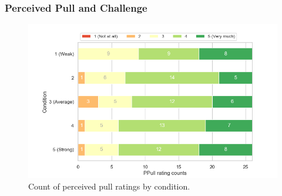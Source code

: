  \clearpage   
\subsubsection{Perceived Pull and Challenge}
\label{subsubsection:ppullChallenge}
  
\begin{figure}[H]
\centering
\captionsetup{justification=centering,margin=0.1cm}
\hspace{-20mm}
\includegraphics[scale=0.7]{Files/Plots/ppull_by_condition_count_stacked.png}
\caption{Count of perceived pull ratings by condition.}
\label{fig:ppullStacked}
\end{figure}
\vspace{-5mm}

